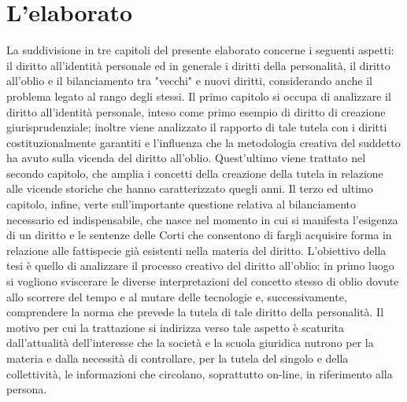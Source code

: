 \section{L’elaborato}
La suddivisione in tre capitoli del presente elaborato concerne i seguenti aspetti: il diritto all’identità personale ed in generale i diritti della personalità, il diritto all’oblio e il bilanciamento tra "vecchi" e nuovi diritti, considerando anche il problema legato al rango degli stessi.
Il primo capitolo si occupa di analizzare il diritto all’identità personale, inteso come primo esempio di diritto di creazione giurisprudenziale; inoltre viene analizzato il rapporto di tale tutela con i diritti costituzionalmente garantiti e l’influenza che la metodologia creativa del suddetto ha avuto sulla vicenda del diritto all’oblio.
Quest’ultimo viene trattato nel secondo capitolo, che amplia i concetti della creazione della tutela in relazione alle vicende storiche che hanno caratterizzato quegli anni.
Il terzo ed ultimo capitolo, infine, verte sull’importante questione relativa al bilanciamento necessario ed indispensabile, che nasce nel momento in cui si manifesta l’esigenza di un diritto e le sentenze delle Corti che consentono di fargli acquisire forma in relazione alle fattispecie già esistenti nella materia del diritto.
L’obiettivo della tesi è quello di analizzare il processo creativo del diritto all’oblio: in primo luogo si vogliono sviscerare le diverse interpretazioni del concetto stesso di oblio dovute allo scorrere del tempo e al mutare delle tecnologie e, successivamente, comprendere la norma che prevede la tutela di tale diritto della personalità.
Il motivo per cui la trattazione si indirizza verso tale aspetto è scaturita dall’attualità dell’interesse che la società e la scuola giuridica nutrono per la materia e dalla necessità di controllare, per la tutela del singolo e della collettività, le informazioni che circolano, soprattutto on-line, in riferimento alla persona.




